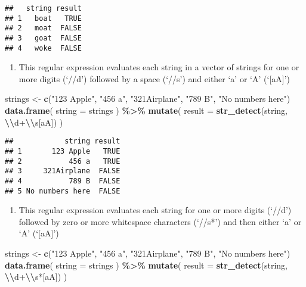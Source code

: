 \documentclass[
]{article}
\newenvironment{Shaded}{\begin{snugshade}}{\end{snugshade}}
\newcommand{\AttributeTok}[1]{\textcolor[rgb]{0.13,0.29,0.53}{#1}}
\newcommand{\FunctionTok}[1]{\textcolor[rgb]{0.13,0.29,0.53}{\textbf{#1}}}
\newcommand{\NormalTok}[1]{#1}
\newcommand{\OtherTok}[1]{\textcolor[rgb]{0.56,0.35,0.01}{#1}}
\newcommand{\SpecialCharTok}[1]{\textcolor[rgb]{0.81,0.36,0.00}{\textbf{#1}}}
\newcommand{\StringTok}[1]{\textcolor[rgb]{0.31,0.60,0.02}{#1}}
\providecommand{\tightlist}{%
  \setlength{\itemsep}{0pt}\setlength{\parskip}{0pt}}
\begin{document}
\begin{verbatim}
##   string result
## 1   boat   TRUE
## 2   moat  FALSE
## 3   goat  FALSE
## 4   woke  FALSE
\end{verbatim}

\begin{enumerate}
\def\labelenumi{\alph{enumi})}
\setcounter{enumi}{4}
\tightlist
\item
  This regular expression evaluates each string in a vector of strings
  for one or more digits (`//d') followed by a space (`//s') and either
  `a' or `A' (`{[}aA{]}')
\end{enumerate}

\begin{Shaded}
\begin{Highlighting}[]
\NormalTok{strings }\OtherTok{\textless{}{-}} \FunctionTok{c}\NormalTok{(}\StringTok{"123 Apple"}\NormalTok{, }\StringTok{"456 a"}\NormalTok{, }\StringTok{"321Airplane"}\NormalTok{, }\StringTok{"789 B"}\NormalTok{, }\StringTok{"No numbers here"}\NormalTok{)}
\FunctionTok{data.frame}\NormalTok{( }\AttributeTok{string =}\NormalTok{ strings ) }\SpecialCharTok{\%\textgreater{}\%}
  \FunctionTok{mutate}\NormalTok{( }\AttributeTok{result =} \FunctionTok{str\_detect}\NormalTok{(string, }\StringTok{\textquotesingle{}}\SpecialCharTok{\textbackslash{}\textbackslash{}}\StringTok{d+}\SpecialCharTok{\textbackslash{}\textbackslash{}}\StringTok{s[aA]\textquotesingle{}}\NormalTok{) )}
\end{Highlighting}
\end{Shaded}

\begin{verbatim}
##            string result
## 1       123 Apple   TRUE
## 2           456 a   TRUE
## 3     321Airplane  FALSE
## 4           789 B  FALSE
## 5 No numbers here  FALSE
\end{verbatim}

\begin{enumerate}
\def\labelenumi{\alph{enumi})}
\setcounter{enumi}{5}
\tightlist
\item
  This regular expression evaluates each string for one or more digits
  (`//d') followed by zero or more whitespace characters (`//s*') and
  then either `a' or `A' (`{[}aA{]}')
\end{enumerate}

\begin{Shaded}
\begin{Highlighting}[]
\NormalTok{strings }\OtherTok{\textless{}{-}} \FunctionTok{c}\NormalTok{(}\StringTok{"123 Apple"}\NormalTok{, }\StringTok{"456 a"}\NormalTok{, }\StringTok{"321Airplane"}\NormalTok{, }\StringTok{"789 B"}\NormalTok{, }\StringTok{"No numbers here"}\NormalTok{)}
\FunctionTok{data.frame}\NormalTok{( }\AttributeTok{string =}\NormalTok{ strings ) }\SpecialCharTok{\%\textgreater{}\%}
  \FunctionTok{mutate}\NormalTok{( }\AttributeTok{result =} \FunctionTok{str\_detect}\NormalTok{(string, }\StringTok{\textquotesingle{}}\SpecialCharTok{\textbackslash{}\textbackslash{}}\StringTok{d+}\SpecialCharTok{\textbackslash{}\textbackslash{}}\StringTok{s*[aA]\textquotesingle{}}\NormalTok{) )}
\end{Highlighting}
\end{Shaded}
\end{document}
